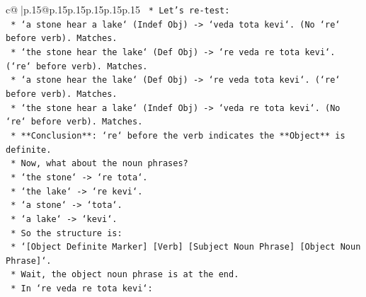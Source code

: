 \documentclass{article}
\begin{document}
{\begin{supertabular}{c@{$\;$}|p{.15\linewidth}@{}p{.15\linewidth}p{.15\linewidth}p{.15\linewidth}p{.15\linewidth}p{.15\linewidth}}
{{{\texttt{                                                                        *   Let's re{-}test:} \\
\texttt{                                                                            *   `a stone hear a lake` (Indef Obj) {-}> `veda tota kevi`. (No `re` before verb). Matches.} \\
\texttt{                                                                            *   `the stone hear the lake` (Def Obj) {-}> `re veda re tota kevi`. (`re` before verb). Matches.} \\
\texttt{                                                                            *   `a stone hear the lake` (Def Obj) {-}> `re veda tota kevi`. (`re` before verb). Matches.} \\
\texttt{                                                                            *   `the stone hear a lake` (Indef Obj) {-}> `veda re tota kevi`. (No `re` before verb). Matches.} \\
\texttt{                                                                        *   **Conclusion**: `re` before the verb indicates the **Object** is definite.} \\
\texttt{                                                                        *   Now, what about the noun phrases?} \\
\texttt{                                                                            *   `the stone` {-}> `re tota`.} \\
\texttt{                                                                            *   `the lake` {-}> `re kevi`.} \\
\texttt{                                                                            *   `a stone` {-}> `tota`.} \\
\texttt{                                                                            *   `a lake` {-}> `kevi`.} \\
\texttt{                                                                        *   So the structure is:} \\
\texttt{                                                                            *   `{[}Object Definite Marker{]} {[}Verb{]} {[}Subject Noun Phrase{]} {[}Object Noun Phrase{]}`.} \\
\texttt{                                                                            *   Wait, the object noun phrase is at the end.} \\
\texttt{                                                                            *   In `re veda re tota kevi`:} \\
}}}
\end{supertabular}}
\end{document}
